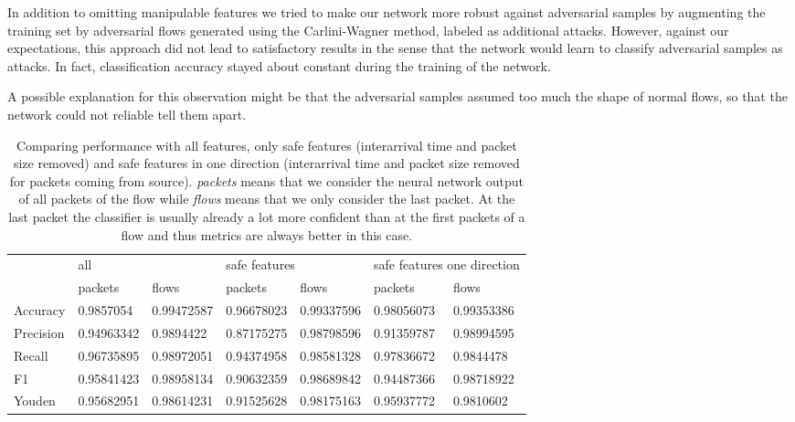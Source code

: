 \documentclass[conference]{IEEEtran}
\begin{document}
In addition to omitting manipulable features we tried to make our network more robust against adversarial samples by augmenting the training set by adversarial flows generated using the Carlini-Wagner method, labeled as additional attacks. However, against our expectations, this approach did not lead to satisfactory results in the sense that the network would learn to classify adversarial samples as attacks. In fact, classification accuracy stayed about constant during the training of the network.

A possible explanation for this observation might be that the adversarial samples assumed too much the shape of normal flows, so that the network could not reliable tell them apart.

\begin{table}
\caption{Comparing performance with all features, only safe features (interarrival time and packet size removed) and safe features in one direction (interarrival time and packet size removed for packets coming from source). \textit{packets} means that we consider the neural network output of all packets of the flow while \textit{flows} means that we only consider the last packet. At the last packet the classifier is usually already a lot more confident than at the first packets of a flow and thus metrics are always better in this case.}  \label{tab:performance_results_no_manipulable}
\newcommand{\cmidrulespace}{6pt}
\centering
\begin{tabular}{l l l l l l l} \toprule
& \multicolumn{2}{l}{all} & \multicolumn{2}{l}{safe features} & \multicolumn{2}{l}{safe features one direction} \\
\cmidrule(r){2-3} \cmidrule(lr){4-5} \cmidrule(l){6-7}
& packets & flows & packets & flows & packets & flows \\
\midrule
Accuracy & 0.9857054 & 0.99472587 & 0.96678023 & 0.99337596 & 0.98056073 & 0.99353386 \\
Precision & 0.94963342 & 0.9894422 & 0.87175275 & 0.98798596 & 0.91359787 & 0.98994595 \\
Recall & 0.96735895 & 0.98972051 & 0.94374958 & 0.98581328 & 0.97836672 & 0.9844478 \\
F1 & 0.95841423 & 0.98958134 & 0.90632359 & 0.98689842 & 0.94487366 & 0.98718922 \\
Youden & 0.95682951 & 0.98614231 & 0.91525628 & 0.98175163 & 0.95937772 & 0.9810602 \\
\bottomrule
\end{tabular}
\end{table}
\end{document}
